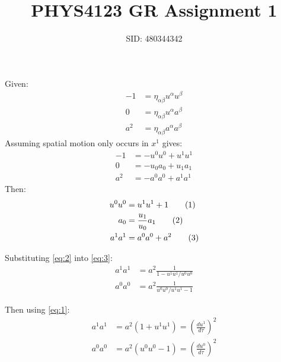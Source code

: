 \documentclass[a4paper]{article}
\title{PHYS4123 GR Assignment 1}
\author{SID: 480344342}
\newcommand{\horln}{\vspace{-6mm}\begin{flushleft}\mbox{}\hrulefill\mbox{}
	\end{flushleft}\vspace{-6mm}}
\newcommand\eq{\addtocounter{equation}{1}\tag{\theequation}}
\begin{document}

\maketitle
\horln

\setcounter{page}{1}
\section{}
\subsubsection{}
Given:
\begin{align*}-1 &= \eta_{\alpha \beta} u^\alpha u^\beta\\
0 &= \eta_{\alpha \beta} u^\alpha a^\beta \\
a^2 &= \eta_{\alpha \beta} a^\alpha a^\beta
\end{align*}
Assuming spatial motion only occurs in $x^1$ gives:
\begin{align*}
-1 &= -u^0u^0 + u^1u^1\\
0 &= -u_0a_0 + u_1 a_1\\
a^2 &= -a^0a^0 + a^1a^1
\end{align*}
Then:
\begin{align*}
u^0u^0 &= u^1u^1 + 1 \eq \label{eq:1}\\
a_0 &= \frac{u_1}{u_0} a_1 \eq \label{eq:2}\\
a^1a^1 &= a^0a^0 + a^2 \eq \label{eq:3}
\end{align*}

Substituting \eqref{eq:2} into \eqref{eq:3}:
\begin{align*}
a^1a^1 &= a^2 \frac{1}{1-u^1u^1/u^0u^0}\\
a^0a^0 &= a^2 \frac{1}{u^0u^0/u^1u^1 - 1}
\end{align*}

Then using \eqref{eq:1}:
\begin{align*}
a^1a^1 &= a^2 (1 + u^1 u^1) = \left(\frac{du^1}{d\tau}\right)^2\\
a^0a^0 &=  a^2 (u^0 u^0 - 1) =  \left(\frac{du^0}{d\tau}\right)^2
\end{align*}
\end{document}
